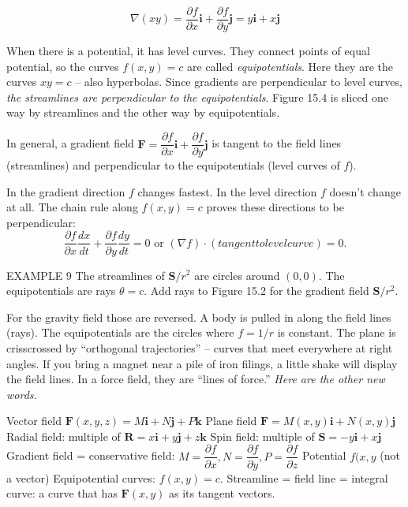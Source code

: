 $$\nabla(xy)=\dfrac{\partial f}{\partial x}\mathbf{i}+\dfrac{\partial f}{\partial y}\mathbf{j}=y\mathbf{i}+x\mathbf{j}$$

When there is a potential, it has level curves. They connect points of equal potential,
so the curves $f(x, y) = c$ are called \emph{equipotentials}. Here they are the curves $xy = c$ -- also
hyperbolas. Since gradients are perpendicular to level curves, \emph{the streamlines are
perpendicular to the equipotentials}. Figure 15.4 is sliced one way by streamlines and
the other way by equipotentials.

In general, a gradient field $\mathbf{F} =\dfrac{\partial f}{\partial x}\mathbf{i}+\dfrac{\partial f}{\partial y}\mathbf{j}$ is tangent to the field lines (streamlines) and perpendicular to the equipotentials (level curves of $f$).

In the gradient direction $f$ changes fastest. In the level direction $f$ doesn't change at
all. The chain rule along $f (x, y) = c$ proves these directions to be perpendicular:
$$\dfrac{\partial f}{\partial x}\dfrac{dx}{dt}+\dfrac{\partial f}{\partial y}\dfrac{dy}{dt}=0 \text{ or } (\nabla f)\cdot(tangent to level curve)=0.$$

EXAMPLE 9 The streamlines of $\mathbf{S}/r^2$ are circles around $(0,0)$. The equipotentials are
rays $\theta = c$. Add rays to Figure 15.2 for the gradient field $\mathbf{S}/r^2$.

For the gravity field those are reversed. A body is pulled in along the field lines (rays).
The equipotentials are the circles where $f = 1/r$ is constant. The plane is crisscrossed
by ``orthogonal trajectories'' -- curves that meet everywhere at right angles.
If you bring a magnet near a pile of iron filings, a little shake will display the field
lines. In a force field, they are ``lines of force.'' \emph{Here are the other new words.}

Vector field $\mathbf{F}(x, y, z) = M\mathbf{i} + N\mathbf{j} + P\mathbf{k}$ Plane field $\mathbf{F} = M(x, y)\mathbf{i} + N(x, y)\mathbf{j}$
Radial field: multiple of $\mathbf{R} = x\mathbf{i} + y\mathbf{j} + z\mathbf{k}$ Spin field: multiple of  $\mathbf{S}= - y\mathbf{i} + x\mathbf{j}$
Gradient field = conservative field: $M = \dfrac{\partial f}{\partial x}, N = \dfrac{\partial f}{\partial y}, P = \dfrac{\partial f}{\partial z}$
Potential $f(x, y$ (not a vector) Equipotential curves: $f(x, y) = c$.
Streamline = field line = integral curve: a curve that has $\mathbf{F}(x, y)$ as its tangent
vectors. 

